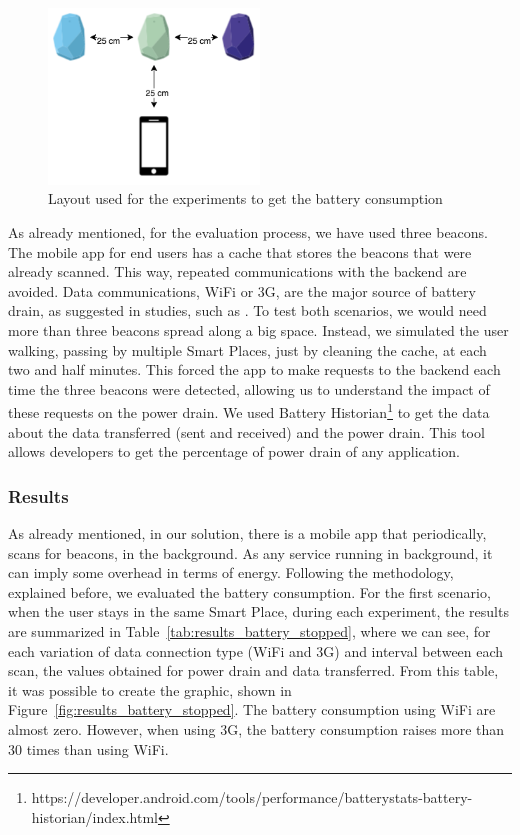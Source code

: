 \begin{figure}[!ht]
  \centering
    \includegraphics[width=0.5\textwidth, keepaspectratio]{figures/experiments_battery_layout}
    \caption[Layout for experiments of battery consumption]{Layout used for the experiments to get the battery consumption}
    \label{fig:layout_experiments_battery_consumption}
\end{figure}

As already mentioned, for the evaluation process, we have used three  beacons.
The mobile app for end users has a cache that stores the beacons that were already scanned.
This way, repeated communications with the backend are avoided.
Data communications, \gls{WiFi} or \gls{3G}, are the major source of battery drain, as suggested in studies, such as \cite{energy}.
To test both scenarios, we would need more than three beacons spread along a big space.
Instead, we simulated the user walking, passing by multiple Smart Places, just by cleaning the cache, at each two and half minutes.
This forced the app to make requests to the backend each time the three beacons were detected, allowing us to understand the impact of these requests on the power drain.
We used Battery Historian\footnote{https://developer.android.com/tools/performance/batterystats-battery-historian/index.html} to get the data about the data transferred (sent and received) and the power drain. This tool allows developers to get the percentage of power drain of any application.

\subsubsection{Results}
\label{sub:evaluation_energy_consumption_results}
As already mentioned, in our solution, there is a mobile app that periodically, scans for beacons, in the background.
As any service running in background, it can imply some overhead in terms of energy.
Following the methodology, explained before, we evaluated the battery consumption.
For the first scenario, when the user stays in the same Smart Place, during each experiment, the results are summarized in Table~\ref{tab:results_battery_stopped}, where we can see, for each variation of data connection type (\gls{WiFi} and \gls{3G}) and interval between each scan, the values obtained for power drain and data transferred.
From this table, it was possible to create the graphic, shown in Figure~\ref{fig:results_battery_stopped}.
The battery consumption using \gls{WiFi} are almost zero.
However, when using \gls{3G}, the battery consumption raises more than 30 times than using \gls{WiFi}.

